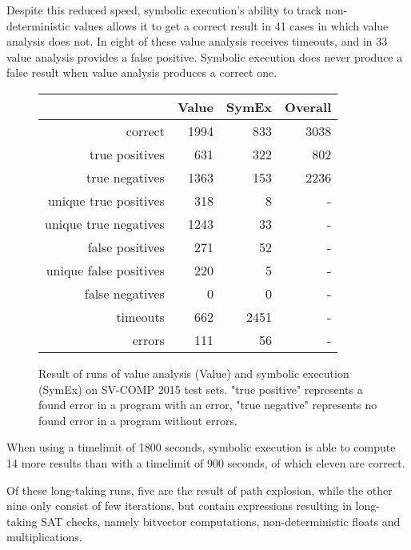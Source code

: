 Despite this reduced speed, symbolic execution's ability to track non-deterministic values allows it to get a correct result in 41 cases in which value analysis does not. In eight of these value analysis receives timeouts, and in 33 value analysis provides a false positive. Symbolic execution does never produce a false result when value analysis produces a correct one.
\begin{figure}
\begin{tabular}{| r || r | r | r |}
\hline
        & Value & SymEx & Overall \\ \hline
correct                & 1994 &  833 & 3038 \\ \hline
true positives         &  631 &  322 &  802 \\ \hline
true negatives         & 1363 &  153 & 2236 \\ \hline
unique true positives  &  318 &    8 &    - \\ \hline
unique true negatives  & 1243 &   33 &    - \\ \hline
false positives        &  271 &   52 &    - \\ \hline
unique false positives &  220 &    5 &    - \\ \hline
false negatives        &    0 &    0 &    - \\ \hline 
timeouts               &  662 & 2451 &    - \\ \hline
errors                 &  111 &   56 &    - \\ \hline
\end{tabular}
\label{tab:diff}
\caption{Result of runs of value analysis (Value) and symbolic execution (SymEx) on SV-COMP 2015 test sets.
  "true positive" represents a found error in a program with an error,
  "true negative" represents no found error in a program without errors.}
\end{figure}

When using a timelimit of 1800 seconds, symbolic execution is able to compute 14 more results than with a timelimit of 900 seconds, of which eleven are correct.

Of these long-taking runs, five are the result of path explosion,
while the other nine only consist of few iterations, but contain expressions resulting in long-taking SAT checks, namely bitvector computations, non-deterministic floats and multiplications.

